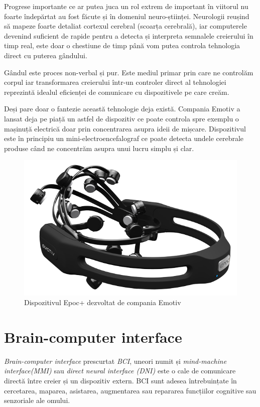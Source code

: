 Progrese importante ce ar putea juca un rol extrem de important în viitorul nu foarte îndepărtat au fost făcute și în domeniul neuro-științei. Neurologii reușind să mapeze foarte detaliat cortexul cerebral (scoarța cerebrală), iar computerele devenind suficient de rapide pentru a detecta și interpreta semnalele creierului în timp real, este doar o chestiune de timp până vom putea controla tehnologia direct cu puterea gândului. 

Gândul este proces non-verbal și pur. Este mediul primar prin care ne controlăm corpul iar transformarea creierului  într-un controler direct al tehnologiei reprezintă idealul eficienței de comunicare cu dispozitivele pe care creăm.

Deși pare doar o fantezie această tehnologie deja există.
Compania Emotiv a lansat deja pe piață un astfel de dispozitiv ce poate controla spre exemplu o mașinuță electrică doar prin concentrarea asupra ideii de mișcare.
Dispozitivul este în principiu un mini-electroencefalograf  ce poate detecta undele cerebrale produse când ne concentrăm asupra unui lucru simplu și clar.

\begin{figure}[h]
  \centering
  \includegraphics[scale=0.6]{img/emotiv_epoc.png}
  \caption{Dispozitivul Epoc+ dezvoltat de compania Emotiv}
\end{figure}
\newpage

\section{Brain-computer interface}

\textit{Brain-computer interface} prescurtat \textit{BCI}, uneori numit și \textit{mind-machine interface(MMI)} sau \textit{direct neural interface (DNI)} este o cale de comunicare directă între creier și un dispozitiv extern. BCI sunt adesea întrebuințate în cercetarea, maparea, asistarea, augmentarea sau repararea funcțiilor cognitive sau senzoriale ale omului.

